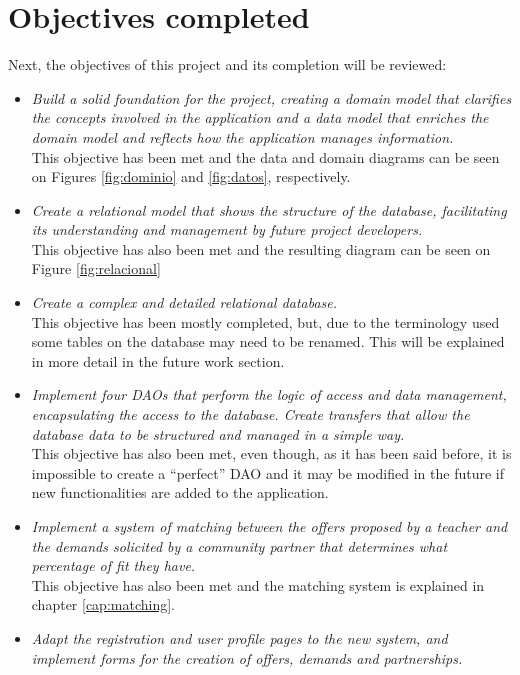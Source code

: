 \documentclass[11pt]{book}
\begin{document}
	\section{Objectives completed}
	Next, the objectives of this project and its completion will be reviewed:
	
	\begin{itemize}
		\item \emph{Build a solid foundation for the project, creating a domain model that clarifies the concepts involved in the application and a data model that enriches the domain model and reflects how the application manages information.}\\
		This objective has been met and the data and domain diagrams can be seen on Figures  \ref{fig:dominio} and \ref{fig:datos}, respectively.
		\item \emph{Create a relational model that shows the structure of the database, facilitating its understanding and management by future project developers.}\\
		This objective has also been met and the resulting diagram can be seen on Figure \ref{fig:relacional}
		\item \emph{Create a complex and detailed relational database.}\\
		This objective has been mostly completed, but, due to the terminology used some tables on the database may need to be renamed. This will be explained in more detail in the future work section.
		\item \emph{Implement four DAOs that perform the logic of access and data management, encapsulating the access to the database. Create transfers that allow the database data to be structured and managed in a simple way.}\\
		This objective has also been met, even though, as it has been said before, it is impossible to create a ``perfect'' DAO and it may be modified in the future if new functionalities are added to the application.
		\item \emph{Implement a system of matching between the offers proposed by a teacher and the demands solicited by a community partner that determines what percentage of fit they have.}\\
		This objective has also been met and the matching system is explained in chapter \ref{cap:matching}.
		\item \emph{ Adapt the registration and user profile pages to the new system, and implement forms for the creation of offers, demands and partnerships.}\\

\end{itemize}
\end{document}

